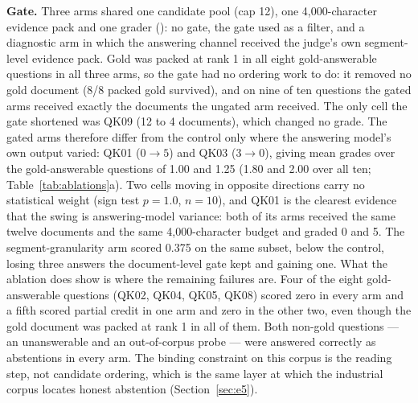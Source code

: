 \textbf{Gate.}
Three arms shared one candidate pool (cap 12), one 4{,}000-character
evidence pack and one grader
(): no gate,
the gate used as a filter, and a
diagnostic arm in which the answering channel received the judge's own
segment-level evidence pack. Gold was packed at rank 1 in all eight
gold-answerable questions in all three arms, so the gate had no ordering
work to do: it removed no gold document (8/8 packed gold survived), and on
nine of ten questions the gated arms received exactly the documents the
ungated arm received. The only cell the gate shortened was QK09 (12 to 4
documents), which changed no grade. The gated arms therefore differ from the
control only where the answering model's own output varied: QK01
($0\to5$) and QK03 ($3\to0$), giving mean grades over the
gold-answerable questions of 1.00 and 1.25 (1.80 and 2.00 over all ten;
Table~\ref{tab:ablations}a). Two cells moving in opposite directions carry
no statistical weight (sign test $p = 1.0$, $n = 10$), and QK01 is the
clearest evidence that the swing is answering-model variance: both of its
arms received the same twelve documents and the same 4{,}000-character
budget and graded 0 and 5. The segment-granularity arm scored 0.375 on the
same subset, below the control, losing three answers the document-level gate
kept and gaining one. What the ablation
does show is where the remaining failures are. Four of the eight
gold-answerable questions (QK02, QK04, QK05, QK08) scored zero in every
arm and a fifth scored partial credit in one arm and zero in the other
two, even though the gold document was packed at rank 1 in all of them.
Both non-gold questions --- an unanswerable and an out-of-corpus
probe --- were answered correctly as abstentions in every arm. The binding
constraint on this corpus is the reading step, not candidate ordering,
which is the same layer at which the industrial corpus locates honest
abstention (Section~\ref{sec:e5}).

